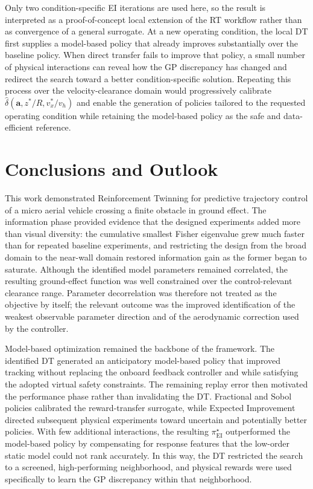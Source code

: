 \documentclass[journal]{IEEEtran}
\begin{document}
Only two condition-specific EI iterations are used here, so the result is interpreted as a proof-of-concept local extension of the RT workflow rather than as convergence of a general surrogate. At a new operating condition, the local DT first supplies a model-based policy that already improves substantially over the baseline policy. When direct transfer fails to improve that policy, a small number of physical interactions can reveal how the GP discrepancy has changed and redirect the search toward a better condition-specific solution. Repeating this process over the velocity-clearance domain would progressively calibrate $\widehat{\delta}(\mathbf a,z^\ast/R,v_x^\ast/v_h)$ and enable the generation of policies tailored to the requested operating condition while retaining the model-based policy as the safe and data-efficient reference.

\section{Conclusions and Outlook}
\label{sec:conclusion}

This work demonstrated Reinforcement Twinning for predictive trajectory control of a micro aerial vehicle crossing a finite obstacle in ground effect. The information phase provided evidence that the designed experiments added more than visual diversity: the cumulative smallest Fisher eigenvalue grew much faster than for repeated baseline experiments, and restricting the design from the broad domain to the near-wall domain restored information gain as the former began to saturate. Although the identified model parameters remained correlated, the resulting ground-effect function was well constrained over the control-relevant clearance range. Parameter decorrelation was therefore not treated as the objective by itself; the relevant outcome was the improved identification of the weakest observable parameter direction and of the aerodynamic correction used by the controller.

Model-based optimization remained the backbone of the framework. The identified DT generated an anticipatory model-based policy that improved tracking without replacing the onboard feedback controller and while satisfying the adopted virtual safety constraints. The remaining replay error then motivated the performance phase rather than invalidating the DT. Fractional and Sobol policies calibrated the reward-transfer surrogate, while Expected Improvement directed subsequent physical experiments toward uncertain and potentially better policies. With few additional interactions, the resulting $\pi_{\mathrm{EI}}^{\star}$ outperformed the model-based policy by compensating for response features that the low-order static model could not rank accurately. In this way, the DT restricted the search to a screened, high-performing neighborhood, and physical rewards were used specifically to learn the GP discrepancy within that neighborhood.
\end{document}
